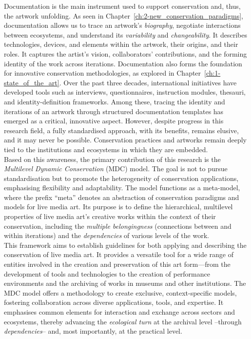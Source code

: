 Documentation is the main instrument used to support conservation and, thus, the artwork unfolding. As seen in Chapter~\ref{ch:2-new_conservation_paradigms}, documentation allows us to trace an artwork’s \textit{biography}, negotiate interactions between ecosystems, and understand its \textit{variability} and \textit{changeability}. It describes technologies, devices, and elements within the artwork, their origins, and their roles. It captures the artist’s vision, collaborators’ contributions, and the forming identity of the work across iterations. Documentation also forms the foundation for innovative conservation methodologies, as explored in Chapter~\ref{ch:1-state_of_the_art}. Over the past three decades, international initiatives have developed tools such as interviews, questionnaires, instruction modules, thesauri, and identity-definition frameworks. Among these, tracing the identity and iterations of an artwork through structured documentation templates has emerged as a critical, innovative aspect. However, despite progress in this research field, a fully standardised approach, with its benefits, remains elusive, and it may never be possible. Conservation practices and artworks remain deeply tied to the institutions and ecosystems in which they are embedded.\\
Based on this awareness, the primary contribution of this research is the \textit{Multilevel Dynamic Conservation} (MDC) model. The goal is not to pursue standardisation but to promote the heterogeneity of conservation applications, emphasising flexibility and adaptability. The model functions as a meta-model, where the prefix ``meta'' denotes an abstraction of conservation paradigms and models for live media art. Its purpose is to define the hierarchical, multilevel properties of live media art’s creative works within the context of their conservation, including the \textit{multiple belongingness} (connections between and within iterations) and the \textit{dependencies} of various levels of the work. \\
This framework aims to establish guidelines for both applying and describing the conservation of live media art. It provides a versatile tool for a wide range of entities involved in the creation and preservation of this art form—from the development of tools and technologies to the creation of performance environments and the archiving of works in museums and other institutions. The MDC model offers a methodology to create exclusive, context-specific models, fostering collaboration across diverse applications, tools, and expertise. It emphasises common elements for interaction and exchange across sectors and ecosystems, thereby advancing the \textit{ecological turn} at the archival level –through \textit{dependencies}– and, most importantly, at the practical level.\\
